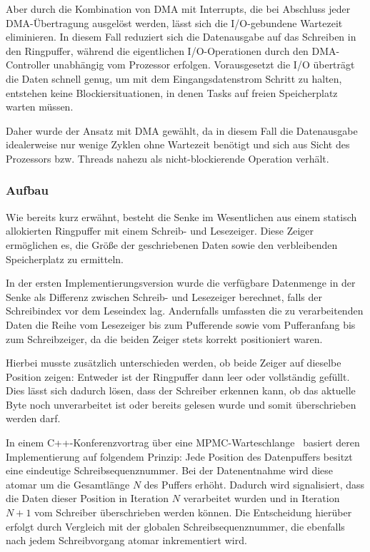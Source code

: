 Aber durch die Kombination von DMA mit Interrupts, die bei Abschluss jeder
DMA-Übertragung ausgelöst werden, lässt sich die I/O-gebundene Wartezeit
eliminieren. In diesem Fall reduziert sich die Datenausgabe auf das Schreiben in
den Ringpuffer, während die eigentlichen I/O-Operationen durch den
DMA-Controller unabhängig vom Prozessor erfolgen. Vorausgesetzt die I/O
überträgt die Daten schnell genug, um mit dem Eingangsdatenstrom Schritt zu
halten, entstehen keine Blockiersituationen, in denen Tasks auf freien
Speicherplatz warten müssen.

Daher wurde der Ansatz mit DMA gewählt, da in diesem Fall die Datenausgabe
idealerweise nur wenige Zyklen ohne Wartezeit benötigt und sich aus Sicht des
Prozessors bzw. Threads nahezu als nicht-blockierende Operation verhält.

\subsubsection{Aufbau}

Wie bereits kurz erwähnt, besteht die Senke im Wesentlichen aus einem statisch
allokierten Ringpuffer mit einem Schreib- und Lesezeiger. Diese Zeiger
ermöglichen es, die Größe der geschriebenen Daten sowie den verbleibenden
Speicherplatz zu ermitteln.

In der ersten Implementierungsversion wurde die verfügbare Datenmenge in der
Senke als Differenz zwischen Schreib- und Lesezeiger berechnet, falls der
Schreibindex vor dem Leseindex lag. Andernfalls umfassten die zu verarbeitenden
Daten die Reihe vom Lesezeiger bis zum Pufferende sowie vom Pufferanfang bis zum
Schreibzeiger, da die beiden Zeiger stets korrekt positioniert waren.

Hierbei musste zusätzlich unterschieden werden, ob beide Zeiger auf dieselbe
Position zeigen: Entweder ist der Ringpuffer dann leer oder vollständig gefüllt.
Dies lässt sich dadurch lösen, dass der Schreiber erkennen kann, ob das aktuelle
Byte noch unverarbeitet ist oder bereits gelesen wurde und somit überschrieben
werden darf.

In einem C++-Konferenzvortrag über eine
\ac{MPMC}-Warteschlange~\cite{CppCon2024LockFreeQueue} basiert deren
Implementierung auf folgendem Prinzip: Jede Position des Datenpuffers besitzt
eine eindeutige Schreibsequenznummer. Bei der Datenentnahme wird diese atomar um
die Gesamtlänge $N$ des Puffers erhöht. Dadurch wird signalisiert, dass die Daten
dieser Position in Iteration $N$ verarbeitet wurden und in Iteration $N+1$ vom
Schreiber überschrieben werden können. Die Entscheidung hierüber erfolgt durch
Vergleich mit der globalen Schreibsequenznummer, die ebenfalls nach jedem
Schreibvorgang atomar inkrementiert wird.

